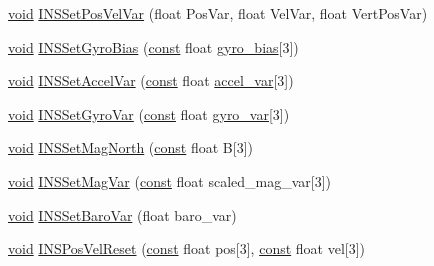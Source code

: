 \begin{DoxyCompactItemize}
\item 
\hyperlink{group___n_a_m_e_ga18028b8badbf1ea7e704ccac3c488e82}{void} \hyperlink{group___i_n_s_g_p_s_ga8894e5945148a0520cd3e4c27f44cdac}{I\-N\-S\-Set\-Pos\-Vel\-Var} (float Pos\-Var, float Vel\-Var, float Vert\-Pos\-Var)
\item 
\hyperlink{group___n_a_m_e_ga18028b8badbf1ea7e704ccac3c488e82}{void} \hyperlink{group___i_n_s_g_p_s_gad385ddb89b431a68df14e4de88be3329}{I\-N\-S\-Set\-Gyro\-Bias} (\hyperlink{group___n_a_m_e_ga7ae6d0e43244213b34de2c2b9aa30da6}{const} float \hyperlink{pios__opahrs__proto_8h_a2d2f11a33fd907b7df5b7b6a7f44e689}{gyro\-\_\-bias}\mbox{[}3\mbox{]})
\item 
\hyperlink{group___n_a_m_e_ga18028b8badbf1ea7e704ccac3c488e82}{void} \hyperlink{group___i_n_s_g_p_s_ga97a7efb6d46aefde3ad20c9b8c44fc60}{I\-N\-S\-Set\-Accel\-Var} (\hyperlink{group___n_a_m_e_ga7ae6d0e43244213b34de2c2b9aa30da6}{const} float \hyperlink{pios__opahrs__proto_8h_a33c8cb8a34ddef8567e05dfc90349adc}{accel\-\_\-var}\mbox{[}3\mbox{]})
\item 
\hyperlink{group___n_a_m_e_ga18028b8badbf1ea7e704ccac3c488e82}{void} \hyperlink{group___i_n_s_g_p_s_gab34cb0f1a9700d0bbf8c0c864311e0e3}{I\-N\-S\-Set\-Gyro\-Var} (\hyperlink{group___n_a_m_e_ga7ae6d0e43244213b34de2c2b9aa30da6}{const} float \hyperlink{pios__opahrs__proto_8h_aac5a918cf946359f5801db26027927fe}{gyro\-\_\-var}\mbox{[}3\mbox{]})
\item 
\hyperlink{group___n_a_m_e_ga18028b8badbf1ea7e704ccac3c488e82}{void} \hyperlink{group___i_n_s_g_p_s_gaff5e5ac00ae43701b4dae7eeb9cdfea8}{I\-N\-S\-Set\-Mag\-North} (\hyperlink{group___n_a_m_e_ga7ae6d0e43244213b34de2c2b9aa30da6}{const} float B\mbox{[}3\mbox{]})
\item 
\hyperlink{group___n_a_m_e_ga18028b8badbf1ea7e704ccac3c488e82}{void} \hyperlink{group___i_n_s_g_p_s_ga0e46db3033f2daeb533de25cb92bbfd9}{I\-N\-S\-Set\-Mag\-Var} (\hyperlink{group___n_a_m_e_ga7ae6d0e43244213b34de2c2b9aa30da6}{const} float scaled\-\_\-mag\-\_\-var\mbox{[}3\mbox{]})
\item 
\hyperlink{group___n_a_m_e_ga18028b8badbf1ea7e704ccac3c488e82}{void} \hyperlink{group___i_n_s_g_p_s_ga5316ca3b2372588b1d2340297e976452}{I\-N\-S\-Set\-Baro\-Var} (float baro\-\_\-var)
\item 
\hyperlink{group___n_a_m_e_ga18028b8badbf1ea7e704ccac3c488e82}{void} \hyperlink{group___i_n_s_g_p_s_gad01d410c07ad8c74fe875b16246a265c}{I\-N\-S\-Pos\-Vel\-Reset} (\hyperlink{group___n_a_m_e_ga7ae6d0e43244213b34de2c2b9aa30da6}{const} float pos\mbox{[}3\mbox{]}, \hyperlink{group___n_a_m_e_ga7ae6d0e43244213b34de2c2b9aa30da6}{const} float vel\mbox{[}3\mbox{]})

\end{DoxyCompactItemize}

